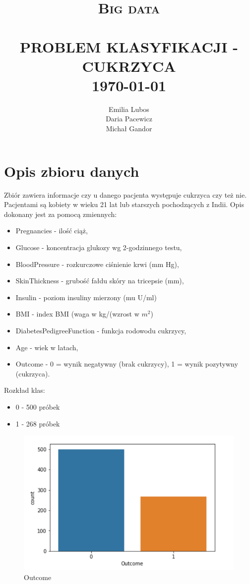 \documentclass[12pt]{article}
\title{	\normalsize \textsc{Big data} 	%
		 	\\[2.0cm]								%
			\HRule{0.5pt} \\						%
			\LARGE \textbf{\uppercase{Problem klasyfikacji - cukrzyca}}	%
			\HRule{2pt} \\ [0.5cm]		%
			\normalsize \today			%
		}
\author{
		Emilia Lubos\\
		Daria Pacewicz\\
		Michał Gandor\\		
}
\makeatletter
\def\printtitle{%
    {\centering \@title\par}}
\def\printauthor{%
    {\centering \large \@author}}
\makeatother
\begin{document}
\thispagestyle{empty}		%

\printtitle					%
  	\vfill
\printauthor				%

\newpage
\tableofcontents
\newpage
\section{Opis zbioru danych}

Zbiór zawiera informacje czy u danego pacjenta występuje cukrzyca czy też nie. Pacjentami są kobiety w wieku 21 lat lub starszych pochodzących z Indii. Opis dokonany jest za pomocą zmiennych:

\begin{itemize}
\item Pregnancies - ilość ciąż,
\item Glucose - koncentracja glukozy wg 2-godzinnego testu,
\item BloodPressure - rozkurczowe ciśnienie krwi (mm Hg),
\item SkinThickness - grubość fałdu skóry na tricepsie (mm),
\item Insulin - poziom insuliny mierzony (mu U/ml)
\item BMI - index BMI (waga w kg/(wzrost w $m^2$)
\item DiabetesPedigreeFunction - funkcja rodowodu cukrzycy,
\item Age - wiek w latach,
\item Outcome - 0 = wynik negatywny (brak cukrzycy), 1 = wynik pozytywny (cukrzyca).
\end{itemize}

Rozkład klas:

\begin{itemize}
\item 0 - 500 próbek
\item 1 - 268 próbek
\end{itemize}

\begin{figure}
	\centering
	\includegraphics{images/outcome.png}
	\caption{Outcome}
	\label{fig:outcome}
\end{figure}
\end{document}
